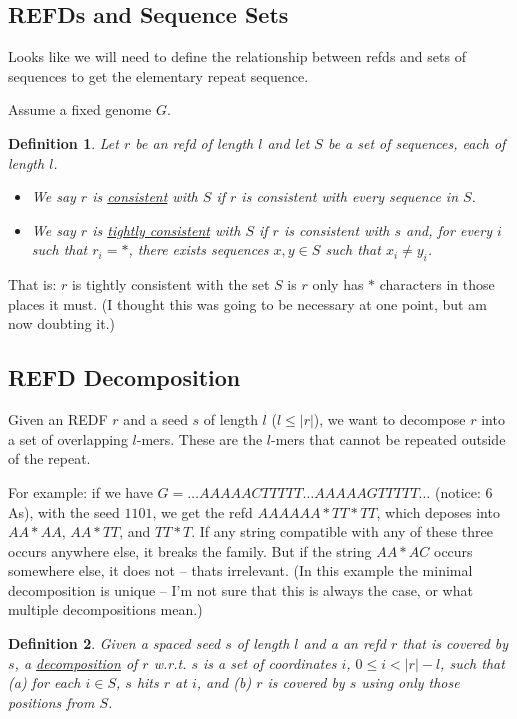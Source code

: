 \documentclass{article}
\newtheorem{definition}{Definition}
\begin{document}
\subsection{REFDs and Sequence Sets}
Looks like we will need to define the relationship between refds and
sets of sequences to get the elementary repeat sequence.

Assume a fixed genome $G$.

\begin{definition}
Let $r$ be an refd of length $l$ and let $S$ be a set of sequences,
each of length $l$.
\begin{itemize}
\item We say $r$ is \underline{consistent} with $S$ if $r$ is
  consistent with every sequence in $S$.
\item We say $r$ is \underline{tightly consistent} with $S$ if $r$ is
  consistent with $s$ and, for every $i$ such that $r_i=*$, there
  exists sequences $x,y \in S$ such that $x_i \neq y_i$.
\end{itemize}
\end{definition}
That is: $r$ is tightly consistent with the set $S$ is $r$ only has
$*$ characters in those places it must.  (I thought this was going to
be necessary at one point, but am now doubting it.)

\subsection{REFD Decomposition}

Given an REDF $r$ and a seed $s$ of length $l$ ($l \leq |r|$), we want
to decompose $r$ into a set of overlapping $l$-mers.  These are the
$l$-mers that cannot be repeated outside of the repeat.

For example: if we have $G = \ldots AAAAACTTTTT\ldots AAAAAGTTTTT
\ldots$ (notice: 6 As), with the seed $1101$, we get the refd $AAAAAA*TT*TT$, which
deposes into $AA*AA$, $AA*TT$, and $TT*T$.  If any string compatible
with any of these three occurs anywhere else, it breaks the family.
But if the string $AA*AC$ occurs somewhere else, it does not -- thats
irrelevant.  (In this example the minimal decomposition is unique -- I'm not
sure that this is always the case, or what multiple decompositions
mean.)

\begin{definition} 
Given a spaced seed $s$ of length $l$ and a an refd $r$ that is
covered by $s$, a \underline{decomposition} of $r$ w.r.t. $s$ is a set of coordinates $i$, $0 \leq i < |r|-l$, such
that (a) for each $i \in S$, $s$ hits $r$ at $i$, and (b) $r$ is
covered by $s$ using only those positions from $S$.
\end{definition}
\end{document}
